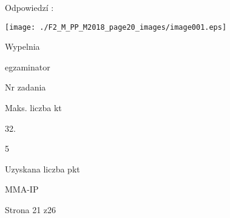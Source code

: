\documentclass[a4paper,12pt]{article}
\begin{document}
Odpowiedzí :
\begin{center}
\texttt{[image: ./F2\_M\_PP\_M2018\_page20\_images/image001.eps]}
\end{center}
Wypelnia

egzaminator

Nr zadania

Maks. liczba kt

32.

5

Uzyskana liczba pkt

MMA-IP

Strona 21 z26
\end{document}
